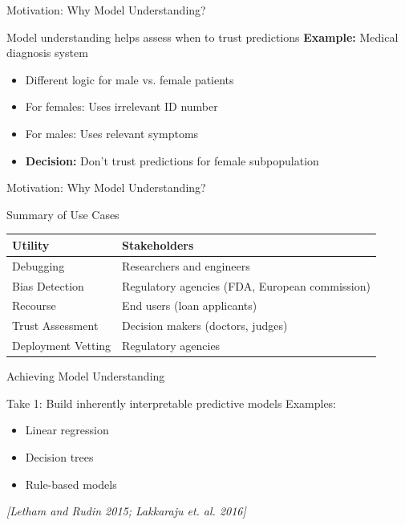 \documentclass[10pt,aspectratio=169]{beamer}
\begin{document}
\begin{frame}{Motivation: Why Model Understanding?}
\begin{block}{Model understanding helps assess when to trust predictions}
\textbf{Example:} Medical diagnosis system
\begin{itemize}
\item Different logic for male vs. female patients
\item For females: Uses irrelevant ID number
\item For males: Uses relevant symptoms
\item \textbf{Decision:} Don't trust predictions for female subpopulation
\end{itemize}
\end{block}
\end{frame}

\begin{frame}{Motivation: Why Model Understanding?}
\begin{block}{Summary of Use Cases}
\begin{table}
\centering
\begin{tabular}{ll}
\toprule
\textbf{Utility} & \textbf{Stakeholders} \\
\midrule
Debugging & Researchers and engineers \\
Bias Detection & Regulatory agencies (FDA, European commission) \\
Recourse & End users (loan applicants) \\
Trust Assessment & Decision makers (doctors, judges) \\
Deployment Vetting & Regulatory agencies \\
\bottomrule
\end{tabular}
\end{table}
\end{block}
\end{frame}

\begin{frame}{Achieving Model Understanding}
\begin{block}{Take 1: Build inherently interpretable predictive models}
Examples:
\begin{itemize}
\item Linear regression
\item Decision trees
\item Rule-based models
\end{itemize}

\vspace{0.3cm}
\textit{[Letham and Rudin 2015; Lakkaraju et. al. 2016]}
\end{block}
\end{frame}
\end{document}
